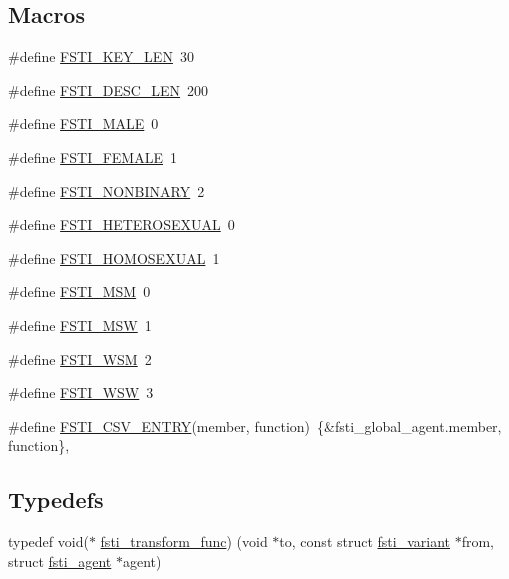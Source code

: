 \subsection*{Macros}
\begin{DoxyCompactItemize}
\item 
\#define \mbox{\hyperlink{fsti-defs_8h_a3699e9ccc973983d2007d73eb31d6fcf}{F\+S\+T\+I\+\_\+\+K\+E\+Y\+\_\+\+L\+EN}}~30
\item 
\#define \mbox{\hyperlink{fsti-defs_8h_adc8804b27630bb18f9845921e268be24}{F\+S\+T\+I\+\_\+\+D\+E\+S\+C\+\_\+\+L\+EN}}~200
\item 
\#define \mbox{\hyperlink{fsti-defs_8h_aeaf09b414ab500eefd42d663a14a5342}{F\+S\+T\+I\+\_\+\+M\+A\+LE}}~0
\item 
\#define \mbox{\hyperlink{fsti-defs_8h_a243d8f3ff09be428475a77101bfc398a}{F\+S\+T\+I\+\_\+\+F\+E\+M\+A\+LE}}~1
\item 
\#define \mbox{\hyperlink{fsti-defs_8h_ac9f99ffb7cd594d061cc3beda55e0f2c}{F\+S\+T\+I\+\_\+\+N\+O\+N\+B\+I\+N\+A\+RY}}~2
\item 
\#define \mbox{\hyperlink{fsti-defs_8h_aa9e96662d71c0d3b57d5c08664cf03d4}{F\+S\+T\+I\+\_\+\+H\+E\+T\+E\+R\+O\+S\+E\+X\+U\+AL}}~0
\item 
\#define \mbox{\hyperlink{fsti-defs_8h_aacfb6b965ae63e46f010cdc6d65d6f1c}{F\+S\+T\+I\+\_\+\+H\+O\+M\+O\+S\+E\+X\+U\+AL}}~1
\item 
\#define \mbox{\hyperlink{fsti-defs_8h_a66afd29dbd82700ead935eb070a55200}{F\+S\+T\+I\+\_\+\+M\+SM}}~0
\item 
\#define \mbox{\hyperlink{fsti-defs_8h_a336d92f918c694ac3884f3e867f50023}{F\+S\+T\+I\+\_\+\+M\+SW}}~1
\item 
\#define \mbox{\hyperlink{fsti-defs_8h_a647bd285bc2230a00edf1dcaa45c8e50}{F\+S\+T\+I\+\_\+\+W\+SM}}~2
\item 
\#define \mbox{\hyperlink{fsti-defs_8h_a92abfa348861e34b6ef7f141b2d33c5b}{F\+S\+T\+I\+\_\+\+W\+SW}}~3
\item 
\#define \mbox{\hyperlink{fsti-defs_8h_a2f02b006df671555a32425a13bb1a22e}{F\+S\+T\+I\+\_\+\+C\+S\+V\+\_\+\+E\+N\+T\+RY}}(member,  function)~\{\&fsti\+\_\+global\+\_\+agent.\+member, function\},
\end{DoxyCompactItemize}
\subsection*{Typedefs}
\begin{DoxyCompactItemize}
\item 
typedef void($\ast$ \mbox{\hyperlink{fsti-defs_8h_ae5b65c9cc706efded6267d78bbf70593}{fsti\+\_\+transform\+\_\+func}}) (void $\ast$to, const struct \mbox{\hyperlink{structfsti__variant}{fsti\+\_\+variant}} $\ast$from, struct \mbox{\hyperlink{structfsti__agent}{fsti\+\_\+agent}} $\ast$agent)
\end{DoxyCompactItemize}
